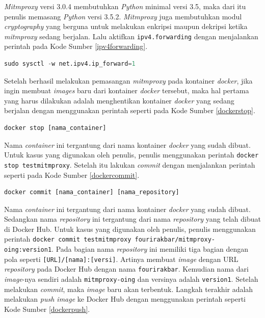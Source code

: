 \textit{Mitmproxy} versi 3.0.4 membutuhkan \textit{Python} minimal versi 3.5, maka dari itu penulis memasang \textit{Python} versi 3.5.2. \textit{Mitmproxy} juga membutuhkan modul \textit{cryptography} yang berguna untuk melakukan enkripsi maupun dekripsi ketika \textit{mitmproxy} sedang berjalan. Lalu aktifkan \texttt{ipv4.forwarding} dengan menjalankan perintah pada Kode Sumber \ref{ipv4forwarding}.
\newline
\begin{lstlisting}[frame=single,tabsize=2,breaklines,captionpos=b,caption=Perintah untuk Mengaktifkan \textit{ipv4.forwarding},language=Python,label=ipv4forwarding]
sudo sysctl -w net.ipv4.ip_forward=1
\end{lstlisting}
\indent Setelah berhasil melakukan pemasangan \textit{mitmproxy} pada kontainer \textit{docker}, jika ingin membuat \textit{images} baru dari kontainer \textit{docker} tersebut, maka hal pertama yang harus dilakukan adalah menghentikan kontainer \textit{docker} yang sedang berjalan dengan menggunakan perintah seperti pada Kode Sumber \ref{dockerstop}.
\newline
\begin{lstlisting}[frame=single,tabsize=2,breaklines,captionpos=b,caption=Perintah untuk Menghentikan Kontainer \textit{Docker},language=Python,label=dockerstop]
docker stop [nama_container]
\end{lstlisting}
Nama \textit{container} ini tergantung dari nama kontainer \textit{docker} yang sudah dibuat. Untuk kasus yang digunakan oleh penulis, penulis menggunakan perintah \texttt{docker stop testmitmproxy}. Setelah itu lakukan \textit{commit} dengan menjalankan perintah seperti pada Kode Sumber \ref{dockercommit}.
\newline
\begin{lstlisting}[frame=single,tabsize=2,breaklines,captionpos=b,caption=Perintah untuk \textit{Commit} Kontainer \textit{Docker},language=Python,label=dockercommit]
docker commit [nama_container] [nama_repository]
\end{lstlisting}
Nama \textit{container} ini tergantung dari nama kontainer \textit{docker} yang sudah dibuat. Sedangkan nama \textit{repository} ini tergantung dari nama \textit{repository} yang telah dibuat di Docker Hub. Untuk kasus yang digunakan oleh penulis, penulis menggunakan perintah \texttt{docker commit testmitmproxy fourirakbar/mitmproxy-oing:version1}. Pada bagian nama \textit{repository} ini memiliki tiga bagian dengan pola seperti \texttt{[URL]/[nama]:[versi]}. Artinya membuat \textit{image} dengan URL \textit{repository} pada Docker Hub dengan nama \texttt{fourirakbar}. Kemudian nama dari \textit{image}-nya sendiri adalah \texttt{mitmproxy-oing} dan versinya adalah \texttt{version1}. Setelah melakukan \textit{commit}, maka \textit{image} baru akan terbentuk. Langkah terakhir adalah melakukan \textit{push image} ke Docker Hub dengan menggunakan perintah seperti Kode Sumber \ref{dockerpush}.
